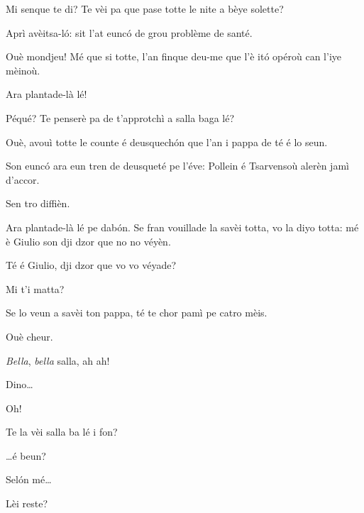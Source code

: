 \begin{drama}
\Ornellaspeaks Mi senque te di? Te vèi pa que pase totte le nite a bèye solette?

\Vandaspeaks{} Aprì avèitsa-l\'o: sit l’at eunc\'o de grou problème de santé.


\Ornellaspeaks Ouè mondjeu! Mé que si totte, l’an finque deu-me que l’è it\'o opéroù can l'iye mèinoù.

\Vilmaspeaks{} Ara plantade-là lé!

\Vandaspeaks	Péqué? Te penserè pa de t’approtchì a salla baga lé?

\Ornellaspeaks	 Ouè, avouì totte le counte é deusquech\'on que l’an i pappa de té é lo seun.

\Vandaspeaks	Son eunc\'o ara eun tren de deusqueté pe l’éve: Pollein é Tsarvensoù alerèn jamì d’accor.

\Ornellaspeaks	 Sen tro diffièn.

\Vilmaspeaks Ara plantade-là lé pe dab\'on.  Se fran vouillade la savèi totta, vo la diyo totta: mé è Giulio son dji dzor que no no véyèn.

\Ornellaspeaks	 Té é Giulio, dji dzor que vo vo véyade?

\Vandaspeaks Mi t'i matta?

\Ornellaspeaks Se lo veun a savèi ton pappa, té te chor pamì pe catro mèis.

\Vandaspeaks Ouè cheur.


\Dinospeaks{} \textit{Bella}, \textit{bella} salla, ah ah!

\Genespeaks Dino\ldots

\Dinospeaks Oh!

\Genespeaks{} Te la vèi salla ba lé i fon?

\Dinospeaks \ldots é beun?

\Genespeaks Sel\'on mé\ldots

\Dinospeaks Lèi reste?



\end{drama}
